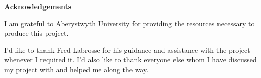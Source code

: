 \thispagestyle{empty}

\begin{center}
    {\LARGE\bf Acknowledgements}
\end{center}

I am grateful to Aberystwyth University for providing the resources necessary to produce this project.

I'd like to thank Fred Labrosse for his guidance and assistance with the project whenever I required it. I'd also like to thank everyone else whom I have discussed my project with and helped me along the way. 
